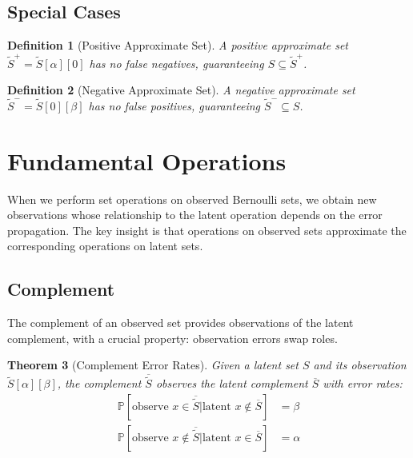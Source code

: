 \documentclass[11pt,final,hidelinks]{article}
\newtheorem{theorem}{Theorem}[section]
\newtheorem{definition}[theorem]{Definition}
\newcommand{\obs}[1]{\widetilde{#1}}  %
\newcommand{\SetComplement}[1]{\overline{#1}}
\newcommand{\Prob}[1]{\mathbb{P}\left[#1\right]}
\newcommand{\fprate}{\alpha}
\newcommand{\fnrate}{\beta}
\begin{document}
\subsection{Special Cases}

\begin{definition}[Positive Approximate Set]
A positive approximate set $\obs{S}^+ = \obs{S}[\fprate][0]$ has no false negatives, guaranteeing $S \subseteq \obs{S}^+$.
\end{definition}

\begin{definition}[Negative Approximate Set]
A negative approximate set $\obs{S}^- = \obs{S}[0][\fnrate]$ has no false positives, guaranteeing $\obs{S}^- \subseteq S$.
\end{definition}

\section{Fundamental Operations}

When we perform set operations on observed Bernoulli sets, we obtain new observations whose relationship to the latent operation depends on the error propagation. The key insight is that operations on observed sets approximate the corresponding operations on latent sets.

\subsection{Complement}

The complement of an observed set provides observations of the latent complement, with a crucial property: observation errors swap roles.

\begin{theorem}[Complement Error Rates]
Given a latent set $S$ and its observation $\obs{S}[\fprate][\fnrate]$, the complement $\SetComplement{\obs{S}}$ observes the latent complement $\SetComplement{S}$ with error rates:
\begin{align}
\Prob{\text{observe } x \in \SetComplement{\obs{S}} | \text{latent } x \notin \SetComplement{S}} &= \fnrate \\
\Prob{\text{observe } x \notin \SetComplement{\obs{S}} | \text{latent } x \in \SetComplement{S}} &= \fprate
\end{align}
\end{theorem}
\end{document}

